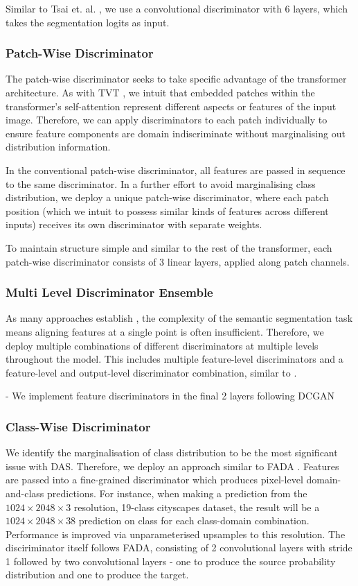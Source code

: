 \documentclass[a4paper,12pt]{report}
\begin{document}
Similar to Tsai et. al. \cite{tsai_learning_2020}, we use a convolutional discriminator with 6 layers, which takes the segmentation logits as input.

\subsubsection{Patch-Wise Discriminator}
The patch-wise discriminator seeks to take specific advantage of the transformer architecture. As with TVT \cite{yang_tvt_2021}, we intuit that embedded patches within the transformer's self-attention represent different aspects or features of the input image. Therefore, we can apply discriminators to each patch individually to ensure feature components are domain indiscriminate without marginalising out distribution information.

In the conventional patch-wise discriminator, all features are passed in sequence to the same discriminator. In a further effort to avoid marginalising class distribution, we deploy a unique patch-wise discriminator, where each patch position (which we intuit to possess similar kinds of features across different inputs) receives its own discriminator with separate weights.

To maintain structure simple and similar to the rest of the transformer, each patch-wise discriminator consists of 3 linear layers, applied along patch channels.

\subsubsection{Multi Level Discriminator Ensemble}
As many approaches establish \cite{hoffman_fcns_2016} \cite{bermudez-chacon_domain-adaptive_2018}, the complexity of the semantic segmentation task means aligning features at a single point is often insufficient. Therefore, we deploy multiple combinations of different discriminators at multiple levels throughout the model. This includes multiple feature-level discriminators and a feature-level and output-level discriminator combination, similar to \cite{tsai_learning_2020}.

- We implement feature discriminators in the final 2 layers following DCGAN \cite{tsai_learning_2020}
\subsubsection{Class-Wise Discriminator}
We identify the marginalisation of class distribution to be the most significant issue with DAS. Therefore, we deploy an approach similar to FADA \cite{wang_classes_2020}. Features are passed into a fine-grained discriminator which produces pixel-level domain-and-class predictions. For instance, when making a prediction from the $1024 \times 2048 \times 3$ resolution, 19-class cityscapes dataset, the result will be a $1024 \times 2048 \times 38$ prediction on class for each class-domain combination. Performance is improved via unparameterised upsamples to this resolution. The disciriminator itself follows FADA, consisting of 2 convolutional layers with stride 1 followed by two convolutional layers - one to produce the source probability distribution and one to produce the target.
\end{document}
